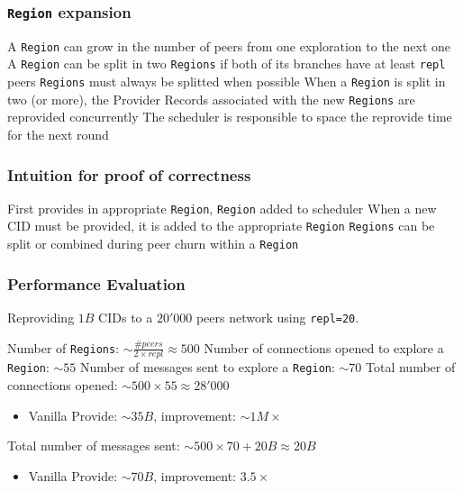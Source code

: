 \documentclass{../pl-slide}
\begin{document}
\begin{frame}
\frametitle{\texttt{Region} expansion}
\begin{itemize}
	\itemc A \texttt{Region} can grow in the number of peers from one exploration to the next one
	\itemc A \texttt{Region} can be split in two \texttt{Regions} if both of its branches have at least \texttt{repl} peers
	\itemc \texttt{Regions} must always be splitted when possible
	\itemc When a \texttt{Region} is split in two (or more), the Provider Records associated with the new \texttt{Regions} are reprovided concurrently
	\itemc The scheduler is responsible to space the reprovide time for the next round
\end{itemize}
\end{frame}

\begin{frame}
\frametitle{Intuition for proof of correctness}
\begin{itemize}
	\itemc First provides in appropriate \texttt{Region}, \texttt{Region} added to scheduler
	\itemc When a new CID must be provided, it is added to the appropriate \texttt{Region}
	\itemc \texttt{Regions} can be split or combined during peer churn within a \texttt{Region}
\end{itemize}
\end{frame}

\begin{frame}
\frametitle{Performance Evaluation}

Reproviding $1B$ CIDs to a $20'000$ peers network using \texttt{repl=20}.
\bigskip
\begin{itemize}
	\itemc Number of \texttt{Regions}: $\sim \frac{\#peers}{2 \times repl} \approx 500$
	\itemc Number of connections opened to explore a \texttt{Region}: $\sim 55$
	\itemc Number of messages sent to explore a \texttt{Region}: $\sim 70$
	\bigskip
	\itemc Total number of connections opened: $\sim 500 \times 55 \approx 28'000$
	\begin{itemize}
		\item[\greencube] Vanilla Provide: $\sim 35B$, improvement: $\sim 1M \times$
	\end{itemize}
	\itemc Total number of messages sent: $\sim 500 \times 70 + 20B \approx 20B$
	\begin{itemize}
		\item[\greencube] Vanilla Provide: $\sim 70B$, improvement: $3.5 \times$
	\end{itemize}
\end{itemize}
\end{frame}
\end{document}
